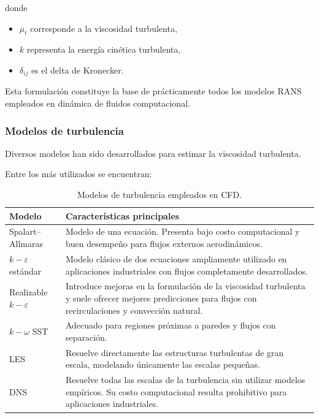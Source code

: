 donde

\begin{itemize}
\item $\mu_t$ corresponde a la viscosidad turbulenta,

\item $k$ representa la energía cinética turbulenta,

\item $\delta_{ij}$ es el delta de Kronecker.
\end{itemize}

Esta formulación constituye la base de prácticamente todos los modelos RANS empleados en dinámica de fluidos computacional.

\subsubsection{Modelos de turbulencia}

Diversos modelos han sido desarrollados para estimar la viscosidad turbulenta.

Entre los más utilizados se encuentran:

\begin{table}[h!]
\centering
\caption{Modelos de turbulencia empleados en CFD.}
\begin{tabular}{p{3.8cm}p{10cm}}
\toprule
Modelo & Características principales\\
\midrule

Spalart--Allmaras &
Modelo de una ecuación. Presenta bajo costo computacional y buen desempeño para flujos externos aerodinámicos. \\

$k-\varepsilon$ estándar &
Modelo clásico de dos ecuaciones ampliamente utilizado en aplicaciones industriales con flujos completamente desarrollados. \\

Realizable $k-\varepsilon$ &
Introduce mejoras en la formulación de la viscosidad turbulenta y suele ofrecer mejores predicciones para flujos con recirculaciones y convección natural. \\

$k-\omega$ SST &
Adecuado para regiones próximas a paredes y flujos con separación. \\

LES &
Resuelve directamente las estructuras turbulentas de gran escala, modelando únicamente las escalas pequeñas. \\

DNS &
Resuelve todas las escalas de la turbulencia sin utilizar modelos empíricos. Su costo computacional resulta prohibitivo para aplicaciones industriales. \\

\bottomrule
\end{tabular}
\end{table}

